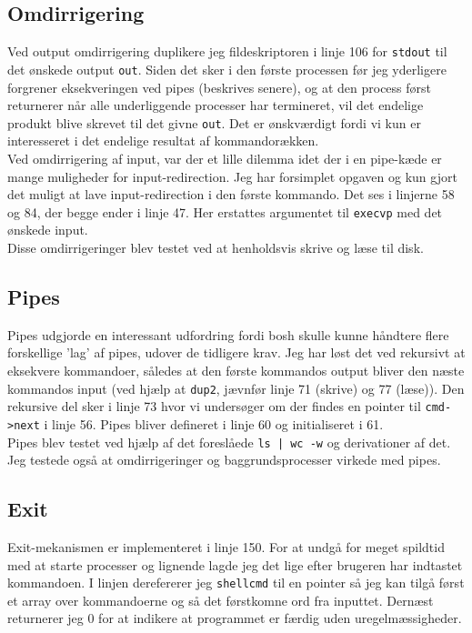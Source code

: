 \documentclass{article}
\begin{document}
\subsection*{Omdirrigering}
Ved output omdirrigering duplikere jeg fildeskriptoren i linje 106 for \texttt{stdout} til det ønskede output \texttt{out}. Siden det sker i den første processen før jeg yderligere forgrener eksekveringen ved pipes (beskrives senere), og at den process først returnerer når alle underliggende processer har termineret, vil det endelige produkt blive skrevet til det givne \texttt{out}. Det er ønskværdigt fordi vi kun er interesseret i det endelige resultat af kommandorækken. \\
Ved omdirrigering af input, var der et lille dilemma idet der i en pipe-kæde er mange muligheder for input-redirection. Jeg har forsimplet opgaven og kun gjort det muligt at lave input-redirection i den første kommando. Det ses i linjerne 58 og 84, der begge ender i linje 47. Her erstattes argumentet til \texttt{execvp} med det ønskede input. \\
Disse omdirrigeringer blev testet ved at henholdsvis skrive og læse til disk.

\subsection*{Pipes}
Pipes udgjorde en interessant udfordring fordi bosh skulle kunne håndtere flere forskellige 'lag' af pipes, udover de tidligere krav. Jeg har løst det ved rekursivt at eksekvere kommandoer, således at den første kommandos output bliver den næste kommandos input (ved hjælp at \texttt{dup2}, jævnfør linje 71 (skrive) og 77 (læse)). Den rekursive del sker i linje 73 hvor vi undersøger om der findes en pointer til \texttt{cmd->next} i linje 56. Pipes bliver defineret i linje 60 og initialiseret i 61. \\
Pipes blev testet ved hjælp af det foreslåede \texttt{ls | wc -w} og derivationer af det. Jeg testede også at omdirrigeringer og baggrundsprocesser virkede med pipes.

\subsection*{Exit}
Exit-mekanismen er implementeret i linje 150. For at undgå for meget spildtid med at starte processer og lignende lagde jeg det lige efter brugeren har indtastet kommandoen. I linjen derefererer jeg \texttt{shellcmd} til en pointer så jeg kan tilgå først et array over kommandoerne og så det førstkomne ord fra inputtet. Dernæst returnerer jeg 0 for at indikere at programmet er færdig uden uregelmæssigheder.
\end{document}
